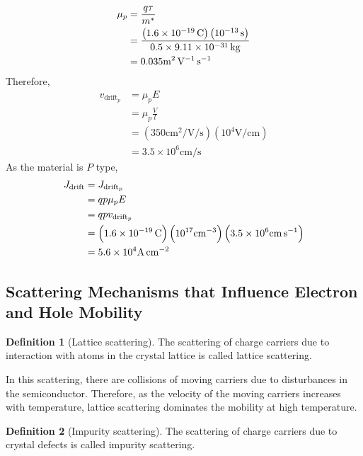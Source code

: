 \documentclass[titlepage, fleqn, a4paper, 12pt, twoside]{article}
\theoremstyle{definition}
\newtheorem{definition}{Definition}
\theoremstyle{theorem}
\begin{document}
\begin{solution}
	\begin{align*}
		\mu_p &= \frac{q \tau}{m^*}\\
		&= \frac{\left( 1.6 \times 10^{-19} \coulomb \right) \left( 10^{-13} \second \right)}{0.5 \times 9.11 \times 10^{-31} \kilogram}\\
		&= 0.035 \si{\metre\squared\per\volt\per\second}
	\end{align*}
	Therefore,
	\begin{align*}
		v_{\text{drift}_p} &= \mu_p E\\
		&= \mu_p \frac{V}{l}\\
		&= \left( 350 \si{\centi\metre\squared\per\volt\per\second} \right) \left( 10^4 \si{\volt\per\centi\metre} \right)\\
		&= 3.5 \times 10^6 \si{\centi\metre\per\second}
	\end{align*}
	As the material is $P$ type,
	\begin{align*}
		J_{\text{drift}} &= J_{\text{drift}_p}\\
		&= q p \mu_p E\\
		&= q p v_{\text{drift}_p}\\
		&= \left( 1.6 \times 10^{-19} \coulomb \right) \left( 10^{17} \si{\per\centi\metre\cubed} \right) \left( 3.5 \times 10^6 \si{\centi\metre\per\second} \right)\\
		&= 5.6 \times 10^4 \si{\ampere\per\centi\metre\squared}
	\end{align*}
\end{solution}

\subsection{Scattering Mechanisms that Influence Electron and Hole Mobility}

\begin{definition}[Lattice scattering]
	The scattering of charge carriers due to interaction with atoms in the crystal lattice is called lattice scattering.
\end{definition}

In this scattering, there are collisions of moving carriers due to disturbances in the semiconductor.
Therefore, as the velocity of the moving carriers increases with temperature, lattice scattering dominates the mobility at high temperature.

\begin{definition}[Impurity scattering]
	The scattering of charge carriers due to crystal defects is called impurity scattering.
\end{definition}
\end{document}
